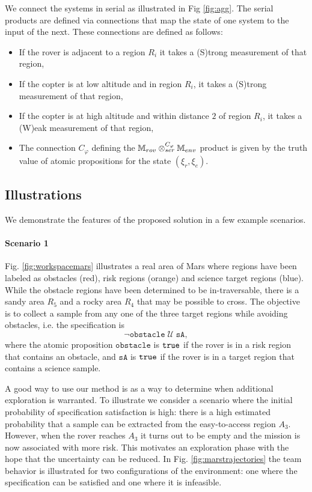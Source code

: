 \documentclass[conference]{IEEEtran}
\begin{document}
We connect the systems in serial as illustrated in Fig \ref{fig:agg}. The serial products are defined via connections that map the state of one system to the input of the next. These connections are defined as follows:
\begin{itemize}
  \item If the rover is adjacent to a region $R_i$ it takes a (S)trong measurement of that region,
  \item If the copter is at low altitude and in region $R_i$, it takes a (S)trong measurement of that region,
  \item If the copter is at high altitude and within distance $2$ of region $R_i$, it takes a (W)eak measurement of that region,
  \item The connection $C_\varphi$ defining the $\mathbb{M}_{rov} \otimes_{ser}^{C_\varphi} \mathbb{M}_{env}$ product is given by the truth value of atomic propositions for the state $(\xi_r, \xi_e)$.
\end{itemize}


\subsection{Illustrations}

We demonstrate the features of the proposed solution in a few example scenarios.

\paragraph{Scenario 1} Fig. \ref{fig:workspacemars} illustrates a real area of Mars where regions have been labeled as obstacles (red), risk regions (orange) and science target regions (blue). While the obstacle regions have been determined to be in-traversable, there is a sandy area $R_5$ and a rocky area $R_4$ that may be possible to cross. The objective is to collect a sample from any one of the three target regions while avoiding obstacles, i.e. the specification is 
\begin{equation}
  \lnot \texttt{obstacle} \; \mathcal U \; \texttt{sA}, 
\end{equation} 
where the atomic proposition $\texttt{obstacle}$ is $\texttt{true}$ if the rover is in a risk region that contains an obstacle, and $\texttt{sA}$ is $\texttt{true}$ if the rover is in a target region that contains a science sample.

A good way to use our method is as a way to determine when additional exploration is warranted. To illustrate we consider a scenario where the initial probability of specification satisfaction is high: there is a high estimated probability that a sample can be extracted from the easy-to-access region $A_3$. However, when the rover reaches $A_3$ it turns out to be empty and the mission is now associated with more risk. This motivates an exploration phase with the hope that the uncertainty can be reduced. In Fig. \ref{fig:marstrajectories} the team behavior is illustrated for two configurations of the environment: one where the specification can be satisfied and one where it is infeasible.
\end{document}
